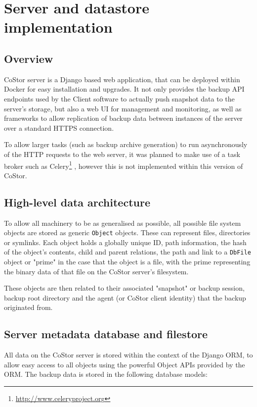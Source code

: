 \documentclass[bsc,frontabs,twoside,singlespacing,parskip,deptreport]{infthesis}     %
\begin{document}
\chapter{Server and datastore implementation}

\section{Overview}

CoStor server is a Django based web application, that can be deployed within Docker for easy
installation and upgrades. It not only provides the backup API endpoints used by the Client
software to actually push snapshot data to the server's storage, but also a web UI for 
management and monitoring, as well as frameworks to allow replication of backup data between
instances of the server over a standard HTTPS connection.

To allow larger tasks (such as backup archive generation) to run asynchronously of the HTTP
requests to the web server, it was planned to make use of a task broker such as Celery\footnote{\url{http://www.celeryproject.org}} 
, however this is not implemented within this version of CoStor.

\section{High-level data architecture}

To allow all machinery to be as generalised as possible, all possible file system objects are stored
as generic \texttt{Object} objects. These can represent files, directories or symlinks. Each object
holds a globally unique ID, path information, the hash of the object's contents, child and parent 
relations, the path and link to a \texttt{DbFile} object or "prime" in the case that the object is
a file, with the prime representing the binary data of that file on the CoStor server's filesystem.

These objects are then related to their associated "snapshot" or backup session, backup root directory
and the agent (or CoStor client identity) that the backup originated from.

\section{Server metadata database and filestore}

All data on the CoStor server is stored within the context of the Django ORM, to allow easy access
to all objects using the powerful Object APIs provided by the ORM. The backup data is stored in the
following database models:
\end{document}
